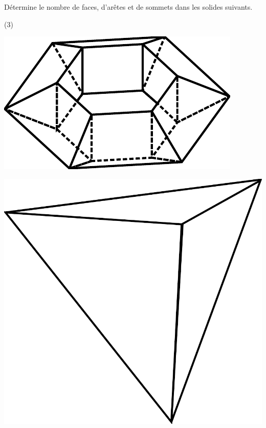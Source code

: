 \documentclass[a4paper,11pt]{report}
\begin{document}
\begin{exop}{
Détermine le nombre de faces, d'arêtes et de sommets dans les solides suivants.	
\begin{tasks}[after-item-skip = 0.4em](3)
	\task 

	\includegraphics[scale=0.5]{media/es-21/tp1}
	\task 

	\includegraphics[scale=0.25]{media/es-21/tp2}
	\task 


\end{tasks}}
\end{exop}
\end{document}
